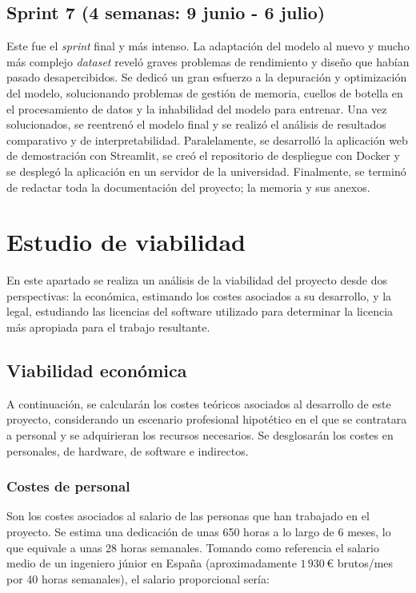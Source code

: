 \subsection{Sprint 7 (4 semanas: 9 junio - 6 julio)}

Este fue el \textit{sprint} final y más intenso. La adaptación del modelo al nuevo y mucho más complejo \textit{dataset} reveló graves problemas de rendimiento y diseño que habían pasado desapercibidos. Se dedicó un gran esfuerzo a la depuración y optimización del modelo, solucionando problemas de gestión de memoria, cuellos de botella en el procesamiento de datos y la inhabilidad del modelo para entrenar. Una vez solucionados, se reentrenó el modelo final y se realizó el análisis de resultados comparativo y de interpretabilidad. Paralelamente, se desarrolló la aplicación web de demostración con Streamlit, se creó el repositorio de despliegue con Docker y se desplegó la aplicación en un servidor de la universidad. Finalmente, se terminó de redactar toda la documentación del proyecto; la memoria y sus anexos.

\section{Estudio de viabilidad}

En este apartado se realiza un análisis de la viabilidad del proyecto desde dos perspectivas: la económica, estimando los costes asociados a su desarrollo, y la legal, estudiando las licencias del software utilizado para determinar la licencia más apropiada para el trabajo resultante.

\subsection{Viabilidad económica}

A continuación, se calcularán los costes teóricos asociados al desarrollo de este proyecto, considerando un escenario profesional hipotético en el que se contratara a personal y se adquirieran los recursos necesarios. Se desglosarán los costes en personales, de hardware, de software e indirectos.

\subsubsection{Costes de personal}

Son los costes asociados al salario de las personas que han trabajado en el proyecto. Se estima una dedicación de unas 650 horas a lo largo de 6 meses, lo que equivale a unas 28 horas semanales. Tomando como referencia el salario medio de un ingeniero júnior en España (aproximadamente $1\,930$\,€ brutos/mes por 40 horas semanales), el salario proporcional sería:

